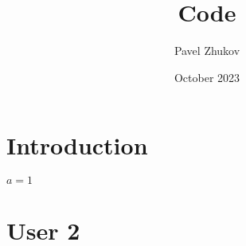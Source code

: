 \documentclass{article}
\title{Code}
\author{Pavel Zhukov}
\date{October 2023}
\begin{document}
\maketitle

\section{Introduction}
$a=1$

\section{User 2}
\end{document}
